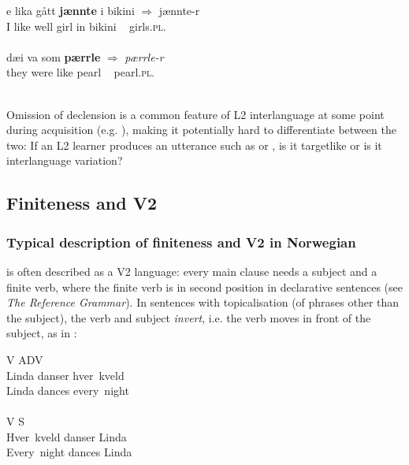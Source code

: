 \documentclass[output=paper,colorlinks,citecolor=brown,modfonts,nonflat]{../langscibook}
\begin{document}
\ea%
    \label{ex:emilsen:7}
\gll e lika gått \textbf{jænnte}  i bikini ${\Rightarrow}$  {jænnte-r} \\
 I like well girl  in bikini ~ girls.\textsc{pl}. \\
   \\

\ex%
    \label{ex:emilsen:8}
\gll dæi va som \textbf{pærrle} ${\Rightarrow}$ \textit{pærrle-r} \\
 they were like pearl ~ pearl.\textsc{pl}. \\
    \\
\z

Omission of declension is a common feature of L2 interlanguage at some point during acquisition (e.g. \citealt{White2003, Trenkic2007, Trenkic2009, GoadWhite2009, EmilsenSøfteland2018, Emilsen2019}), making it potentially hard to differentiate between the two: If an L2 learner produces an utterance such as  or , is it targetlike or is it interlanguage variation?

\subsection{Finiteness and V2}\label{sec:emilsen:3.2}%
\subsubsection{Typical description of finiteness and V2 in Norwegian}%

 is often described as a V2 language: every main clause needs a subject and a finite verb, where the finite verb is in second position in declarative sentences (see \textit{The  Reference Grammar}). In sentences with topicalisation (of phrases other than the subject), the verb and subject \textit{invert}, i.e. the verb moves in front of the subject, as in :


\ea\label{ex:emilsen:9}
\ea\label{ex:emilsen:9a}
 {V} {ADV}\\
Linda danser hver~kveld\\
 Linda dances every~night\\
 \\
\ex\label{ex:emilsen:9b}
 {V} {S}\\
 Hver~kveld danser Linda\\
 Every~night dances Linda\\
 \\
\z
\z
\end{document}
